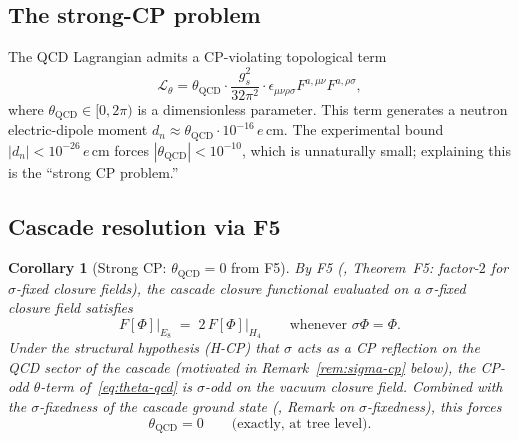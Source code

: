 \documentclass[12pt]{article}
\newtheorem{corollary}[theorem]{Corollary}
\theoremstyle{definition}
\theoremstyle{remark}
\newcommand{\Lcal}{\mathcal{L}}
\begin{document}
\subsection{The strong-CP problem}

The QCD Lagrangian admits a CP-violating topological term
\begin{equation}\label{eq:theta-qcd}
\Lcal_\theta = \theta_{\mathrm{QCD}} \cdot \frac{g_s^2}{32\pi^2} \cdot \epsilon_{\mu\nu\rho\sigma} F^{a,\mu\nu} F^{a,\rho\sigma},
\end{equation}
where $\theta_{\mathrm{QCD}} \in [0, 2\pi)$ is a dimensionless parameter. This term generates a neutron electric-dipole moment $d_n \approx \theta_{\mathrm{QCD}} \cdot 10^{-16}\,e\,\mathrm{cm}$. The experimental bound $|d_n| < 10^{-26}\,e\,\mathrm{cm}$ forces $|\theta_{\mathrm{QCD}}| < 10^{-10}$, which is unnaturally small; explaining this is the ``strong CP problem.''

\subsection{Cascade resolution via F5}

\begin{corollary}[Strong CP: $\theta_{\mathrm{QCD}} = 0$ from F5]\label{cor:strong-cp}
By F5 (\citep{SmartXXXVI}, Theorem~F5: factor-$2$ for $\sigma$-fixed closure fields), the cascade closure functional evaluated on a $\sigma$-fixed closure field satisfies
\begin{equation}\label{eq:F5-qcd-invoke}
F[\Phi]\bigr|_{E_8} \;=\; 2\, F[\Phi]\bigr|_{H_4} \qquad \text{whenever } \sigma\Phi = \Phi.
\end{equation}
Under the structural hypothesis (H-CP) that $\sigma$ acts as a CP reflection on the QCD sector of the cascade (motivated in Remark~\ref{rem:sigma-cp} below), the CP-odd $\theta$-term of~\eqref{eq:theta-qcd} is $\sigma$-odd on the vacuum closure field. Combined with the $\sigma$-fixedness of the cascade ground state (\citep{SmartXXXVI}, Remark on $\sigma$-fixedness), this forces
\begin{equation}
\theta_{\mathrm{QCD}} = 0 \qquad \text{(exactly, at tree level)}.
\end{equation}
\end{corollary}
\end{document}
